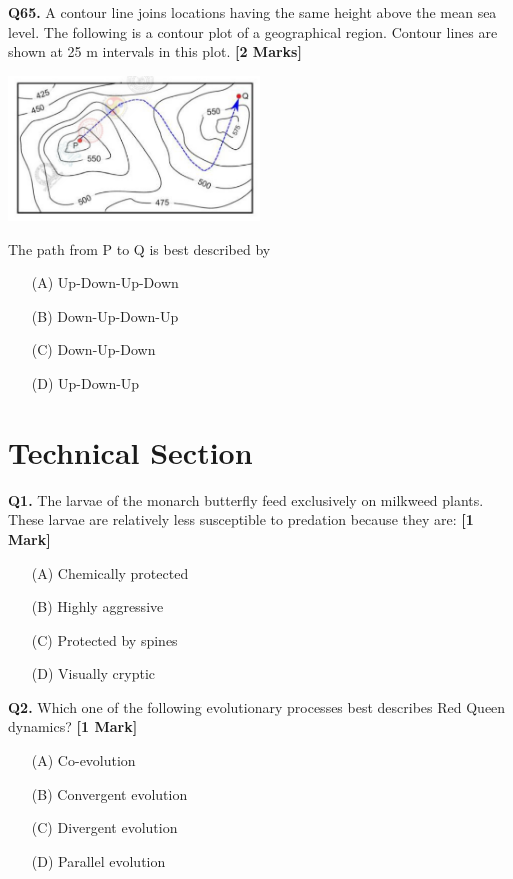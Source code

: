 \documentclass[11pt]{article}
\newcommand{\questiona}[2]{
    \noindent\textbf{Q#2.} #1 \hfill \textbf{[1 Mark]}
}
\newcommand{\questionb}[2]{
    \noindent\textbf{Q#2.} #1 \hfill \textbf{[2 Marks]}
}
\begin{document}
\questionb{A contour line joins locations having the same height above the mean sea level. The following is a contour plot of a geographical region. Contour lines are shown at 25 m intervals in this plot.}{65}
\begin{center}
\includegraphics[width=0.5\textwidth]{figures/10.png}
\end{center}
The path from P to Q is best described by
\begin{enumerate}
    \item[(A)] Up-Down-Up-Down  
    \item[(B)] Down-Up-Down-Up  
    \item[(C)] Down-Up-Down  
    \item[(D)] Up-Down-Up  
\end{enumerate}
\vspace{0.5cm}

\section*{Technical Section}

\questiona{The larvae of the monarch butterfly feed exclusively on milkweed plants. These larvae are relatively less susceptible to predation because they are:}{1}
\begin{enumerate}
    \item[(A)] Chemically protected  
    \item[(B)] Highly aggressive  
    \item[(C)] Protected by spines  
    \item[(D)] Visually cryptic  
\end{enumerate}
\vspace{0.5cm}

\questiona{Which one of the following evolutionary processes best describes Red Queen dynamics?}{2}
\begin{enumerate}
    \item[(A)] Co-evolution  
    \item[(B)] Convergent evolution  
    \item[(C)] Divergent evolution  
    \item[(D)] Parallel evolution  
\end{enumerate}
\vspace{0.5cm}
\end{document}
